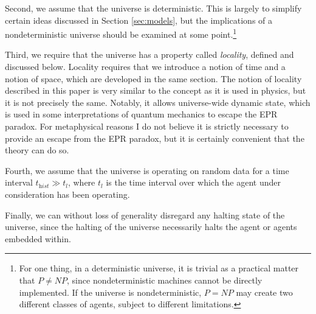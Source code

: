 \documentclass[12pt]{article}
\theoremstyle{definition}
\begin{document}

Second, we assume that the universe is deterministic. This is largely to
simplify certain ideas discussed in Section \ref{sec:models}, but the
implications of a nondeterministic universe should be examined at some
point.\footnote{For one thing, in a deterministic universe, it is trivial as a
practical matter that \(P \not= \mathit{NP}\), since nondeterministic machines
cannot be directly implemented. If the universe is nondeterministic, \(P =
\mathit{NP}\) may create two different classes of agents, subject to different
limitations.}%

Third, we require that the universe has a property called \textit{locality},
defined and discussed below. Locality requires that we introduce a notion of
time and a notion of space\footnotemark, which are developed in the same
section. The notion of locality described in this paper is very similar to the
concept as it is used in physics, but it is not precisely the same. Notably, it
allows universe-wide dynamic state, which is used in some interpretations of
quantum mechanics to escape the EPR paradox. For metaphysical reasons I do not
believe it is strictly necessary to provide an escape from the EPR paradox, but
it is certainly convenient that the theory can do so.


Fourth, we assume that the universe is operating on random data for a time
interval \(t_\textit{hist} \gg t_l\), where \(t_l\) is the time interval over
which the agent under consideration has been operating.

Finally, we can without loss of generality disregard any halting state of the
universe, since the halting of the universe necessarily halts the agent or
agents embedded within.
\end{document}
